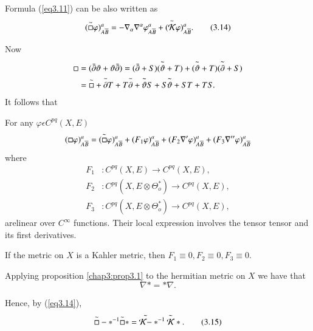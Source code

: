 Formula (\ref{eq3.11}) can be also written as 
\begin{equation*} 
  (\overset{ \thicksim}\Box \varphi)^a _{A \overline{B }}= -
  \nabla_\alpha \nabla^\alpha \varphi^a _{A \overline{B}} + ( \overset{
  \thicksim}{\mathcal{K}} \varphi)^a_{A \overline{B}}.
  \tag{3.14}\label{eq3.14} 
\end{equation*} 

Now 
 \begin{align*}
   \Box & = (\bar{\partial} \vartheta + \vartheta \bar {\partial})=  (
   \bar {\partial} + S) (\overset{\thicksim}{\vartheta} + T) + (
   \overset{\thicksim}\vartheta + T ) (\overset{\thicksim}\partial + S
   ) \\ 
   & = \overset{\thicksim}{\Box}+ \overset{\thicksim}{\partial} T +
   T\overset{\thicksim}{\partial} + \overset{\thicksim}{\vartheta}S +
   S\overset{\thicksim }{\vartheta}+ ST + TS.  
 \end{align*}
It follows that

\begin{lemma}\label{chap3:lem3.4}%
  For any $\varphi \epsilon C^{pq}(X,E)$ 
  $$  
  (\Box \varphi)^a _{A\overline{B}}= (\overset{\thicksim} {\Box}
  \varphi)^a _{A\overline{B}}+ (F_1 \varphi)^a _{A\overline{B}}+(F_2
  \nabla' \varphi)^a _{A\overline{B}}+ (F_3 \nabla'' \varphi)^a
  _{A\overline{B}} 
  $$
  where
  \begin{align*}
   F_1 &: C^{pq} (X,E) \rightarrow C^{pq}(X,E) ,\\
   F_2 &: C^{pq} (X, E \otimes \Theta^*_o ) \rightarrow C^{pq}(X,E), \\
  F_3 &: C^{pq}(X,E \otimes \Theta^*_o ) \rightarrow C^{pq }(X,E),
 \end{align*}
are\pageoriginale linear over $ C^\infty $ functions.  Their local
expression involves the tensor tensor and its first derivatives.   
\end{lemma}

If the metric on $X$ is a Kahler metric, then $F_1 \equiv 0, F_2
\equiv 0, F_3 \equiv 0$. 

Applying proposition \ref{chap3:prop3.1} to  the hermitian metric on
$X$ we have that   
$$ 
\nabla * = * \nabla. 
$$

Hence, by (\ref{eq3.14}),
\begin{equation*}
  \overset{\thicksim}\Box - *^{-1} \overset{\thicksim}\Box * =
  \overset {\thicksim} {\mathcal{K}-}*^{-1}\overset {\thicksim}
  {\mathcal{K}} *.  \tag{3.15}\label{eq3.15}
\end{equation*}

